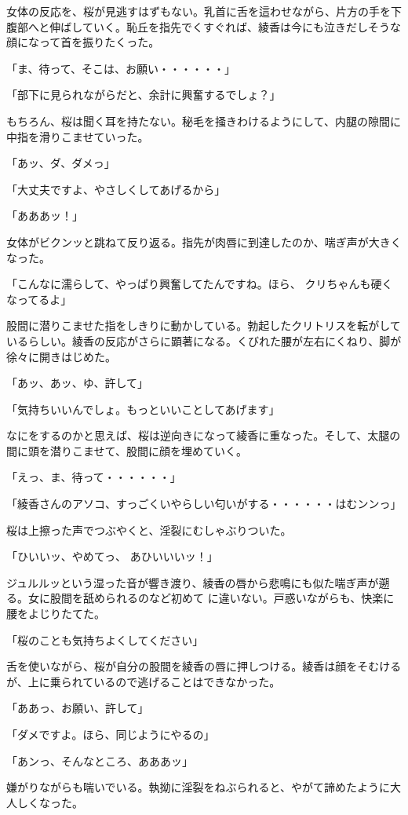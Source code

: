 ﻿\documentclass[book,tate]{jlreq}
\begin{document}
女体の反応を、桜が見逃すはずもない。乳首に舌を這わせながら、片方の手を下腹部へと伸ばしていく。恥丘を指先でくすぐれば、綾香は今にも泣きだしそうな顔になって首を振りたくった。

「ま、待って、そこは、お願い・・・・・・」

「部下に見られながらだと、余計に興奮するでしょ？」

もちろん、桜は聞く耳を持たない。秘毛を掻きわけるようにして、内腿の隙間に中指を滑りこませていった。

「あッ、ダ、ダメっ」

「大丈夫ですよ、やさしくしてあげるから」

「あああッ！」

女体がビクンッと跳ねて反り返る。指先が肉唇に到達したのか、喘ぎ声が大きくなった。

「こんなに濡らして、やっぱり興奮してたんですね。ほら、 クリちゃんも硬くなってるよ」

股間に潜りこませた指をしきりに動かしている。勃起したクリトリスを転がしているらしい。綾香の反応がさらに顕著になる。くびれた腰が左右にくねり、脚が徐々に開きはじめた。

「あッ、あッ、ゆ、許して」

「気持ちいいんでしょ。もっといいことしてあげます」

なにをするのかと思えば、桜は逆向きになって綾香に重なった。そして、太腿の間に頭を潜りこませて、股間に顔を埋めていく。

「えっ、ま、待って・・・・・・」

「綾香さんのアソコ、すっごくいやらしい匂いがする・・・・・・はむンンっ」

桜は上擦った声でつぶやくと、淫裂にむしゃぶりついた。

「ひいいッ、やめてっ、 あひいいいッ！」

ジュルルッという湿った音が響き渡り、綾香の唇から悲鳴にも似た喘ぎ声が遡る。女に股間を舐められるのなど初めて に違いない。戸惑いながらも、快楽に腰をよじりたてた。

「桜のことも気持ちよくしてください」

舌を使いながら、桜が自分の股間を綾香の唇に押しつける。綾香は顔をそむけるが、上に乗られているので逃げることはできなかった。

「ああっ、お願い、許して」

「ダメですよ。ほら、同じようにやるの」

「あンっ、そんなところ、あああッ」

嫌がりながらも喘いでいる。執拗に淫裂をねぶられると、やがて諦めたように大人しくなった。
\end{document}
